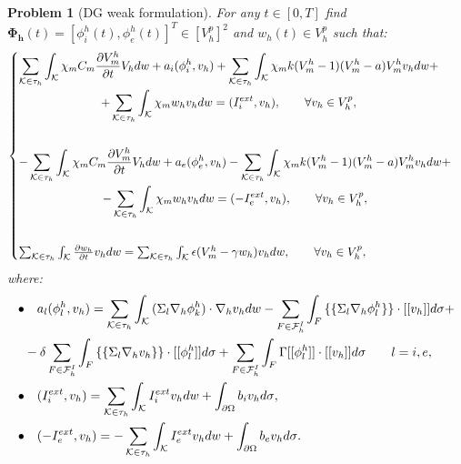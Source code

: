 \documentclass[a4paper,11pt]{article}
\newtheorem{problem}{Problem}
\begin{document}
    \begin{problem}[DG weak formulation]
    For any $t\in[0,T]$ find $\bm{\Phi_h}(t)=[\phi_i^h(t),\phi_e^h(t)]^T \in [V_h^p]^2$  and  $w_h(t) \in V_h^p$ such that:
    \begin{equation*}
    \begin{cases}
    \begin{gathered}
    \sum_{\mathcal{K} \in \tau_h} \int_{\mathcal{K}}{ \chi_m C_m \pdv{V_m^h}{t} V_h dw}+a_i(\phi_i^h,v_h)+\sum_{\mathcal{K} \in \tau_h} \int_{\mathcal{K}}{ \chi_m k (V_m^h-1)(V_m^h-a) V_m^h v_h dw}+\\
    +\sum_{\mathcal{K} \in \tau_h} \int_{\mathcal{K}}{ \chi_m w_h v_h dw}=(I_i^{ext},v_h), \qquad \forall v_h \in V_h^p,\\
    \vspace{2mm}
    \end{gathered}\\
    \begin{gathered}
    -\sum_{\mathcal{K} \in \tau_h} \int_{\mathcal{K}}{ \chi_m C_m \pdv{V_m^h}{t} V_h dw}+a_e(\phi_e^h,v_h)-\sum_{\mathcal{K} \in \tau_h} \int_{\mathcal{K}}{ \chi_m k (V_m^h-1)(V_m^h-a) V_m^h v_h dw}+\\
    -\sum_{\mathcal{K} \in \tau_h} \int_{\mathcal{K}}{ \chi_m w_h v_h dw}=(-I_e^{ext},v_h), \qquad \forall v_h \in V_h^p,\\
       \vspace{2mm}
    \end{gathered}\\
    \sum_{\mathcal{K} \in \tau_h} \int_{\mathcal{K}}{\pdv{w_h}{t}v_h dw}=\sum_{\mathcal{K} \in \tau_h} \int_{\mathcal{K}}{\epsilon (V_m^h-\gamma w_h) v_h dw}, \qquad \forall v_h \in V_h^p,\\
    \end{cases}
    \end{equation*}
    \vspace{5mm}
    where:
    \vspace{3mm}
    \begin{equation}\label{forgamma}
    \begin{aligned}
    \bullet& \quad a_l(\phi_l^h,v_h)=\sum_{\mathcal{K} \in \tau_h} \int_{\mathcal{K}}{(\Sigma_l \nabla_h \phi_k^h) \cdot \nabla_h v_h dw}-\sum_{F \in \mathcal{F}_h^I} \int_F { \{\{\Sigma_l \nabla_h \phi_l^h \}\} \cdot [[v_h]] d\sigma}+\\
    &-\delta \sum_{F \in \mathcal{F}_h^I} \int_F{ \{\{\Sigma_l \nabla_h v_h\}\} \cdot [[\phi_l^h]]d\sigma}+\sum_{F \in \mathcal{F}_h^I}\int_F {\Gamma [[\phi_l^h]] \cdot [[v_h]] d\sigma} \qquad l=i,e,\\
    \newline
    \bullet& \quad (I_i^{ext},v_h)=\sum_{\mathcal{K} \in \tau_h} \int_{\mathcal{K}} {I_i^{ext} v_h dw}+\int_{\partial \Omega}{b_i v_h d\sigma},\\
    \newline
    \bullet& \quad (-I_e^{ext},v_h)=-\sum_{\mathcal{K} \in \tau_h} \int_{\mathcal{K}} {I_e^{ext} v_h dw}+\int_{\partial \Omega}{b_e v_h d\sigma}.
    \end{aligned}
    \end{equation}
    

\end{problem}
\end{document}
